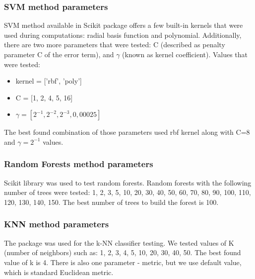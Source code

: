 \documentclass{llncs}
\begin{document}
\vspace{-6pt}
\subsubsection{SVM method parameters}
SVM method available in Scikit package offers a few built-in kernels that were used during computations: radial basis function and polynomial. Additionally, there are two more parameters that were tested: C (described as penalty parameter C of the error term), and $\gamma$ (known as kernel coefficient). Values that were tested:\vspace{-6pt}
\begin{itemize}
	\item kernel = ['rbf', 'poly']
	\item C = [1, 2, 4, 5, 16]
	\item $\gamma = [2^{-1}, 2^{-2}, 2^{-3}, 0,00025]$
\end{itemize}
The best found combination of those parameters used rbf kernel along with C=8 and $\gamma = 2^{-1}$ values.

\vspace{-6pt}
\subsubsection{Random Forests method parameters}
Scikit library was used to test random forests. Random forests with the following number of trees were tested: 1, 2, 3, 5, 10, 20, 30, 40, 50, 60, 70, 80, 90, 100, 110, 120, 130, 140, 150. The best number of trees to build the forest is 100.

\vspace{-6pt}
\subsubsection{KNN method parameters}
The package was used for the k-NN classifier testing. We tested values of K (number of neighbors) such as: 1, 2, 3, 4, 5, 10, 20, 30, 40, 50. The best found value of k is 4. There is also one parameter - metric, but we use default value, which is standard Euclidean metric.


\end{document}
